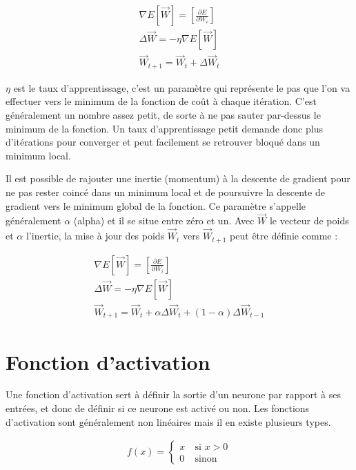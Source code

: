 {\Large
	\setlength{\abovedisplayskip}{-0.5cm}
	\begin{gather*}
		\nabla E[\overrightarrow{W}] = [\frac{\partial E}{\partial W_{i}}] \\
		\Delta\overrightarrow{W} = -\eta\nabla E[\overrightarrow{W}] \\
		\overrightarrow{W}_{t+1} = \overrightarrow{W}_{t} + \Delta\overrightarrow{W}_{t}
	\end{gather*}
}

$\eta$ est le taux d’apprentissage, c’est un paramètre qui représente le pas que l’on va effectuer vers le minimum de la fonction de coût à chaque itération. C’est généralement un nombre assez petit, de sorte à ne pas sauter par-dessus le minimum de la fonction. Un taux d’apprentissage petit demande donc plus d’itérations pour converger et peut facilement se retrouver bloqué dans un minimum local.

Il est possible de rajouter une inertie (momentum) à la descente de gradient pour ne pas rester coincé dans un minimum local et de poursuivre la descente de gradient vers le minimum global de la fonction. Ce paramètre s'appelle généralement $\alpha$ (alpha) et il se situe entre zéro et un. Avec $\overrightarrow{W}$ le vecteur de poids et $\alpha$ l'inertie, la mise à jour des poids $\overrightarrow{W}_t$ vers $\overrightarrow{W}_{t+1}$ peut être définie comme :

{\Large
	\setlength{\abovedisplayskip}{-0.5cm}
	\begin{gather*}
		\nabla E[\overrightarrow{W}] = [\frac{\partial E}{\partial W_{i}}] \\
		\Delta\overrightarrow{W} = -\eta\nabla E[\overrightarrow{W}] \\
		\overrightarrow{W}_{t+1} = \overrightarrow{W}_{t} + \alpha\Delta\overrightarrow{W}_{t} + (1 - \alpha)\Delta\overrightarrow{W}_{t-1}
	\end{gather*}
}

\section{Fonction d'activation}
\label{sec:3.2}

Une fonction d'activation sert à définir la sortie d'un neurone par rapport à ses entrées, et donc de définir si ce neurone est activé ou non. Les fonctions d'activation sont généralement non linéaires mais il en existe plusieurs types.

{\Large
	\setlength{\abovedisplayskip}{-0.2cm}
	\begin{gather*}
		f(x) =
		\begin{cases}
			x & \: \text{si } x > 0 \\
			0 & \: \text{sinon}
		\end{cases}
	\end{gather*}
}

